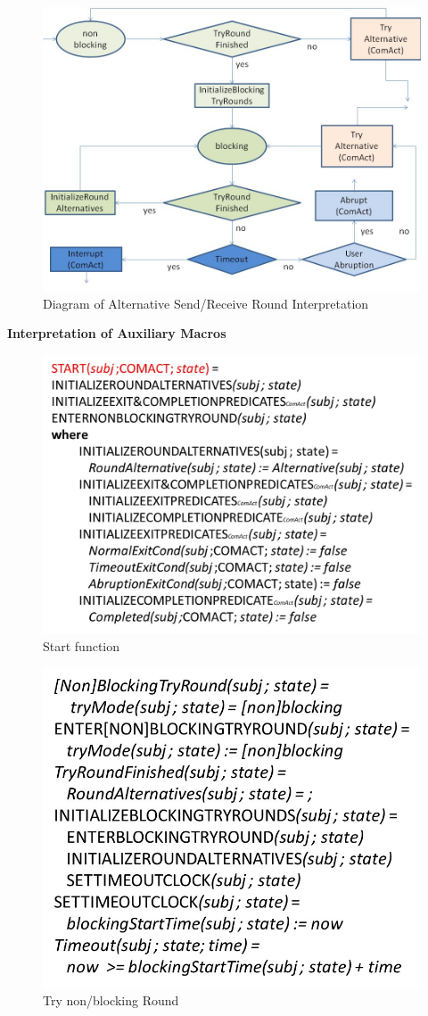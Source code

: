 \begin{figure}[ph]
	\centering
	\includegraphics[width=0.6\linewidth]{20181026-Ontologie-Bilder/Grafiken-Ontologie/SUbjectExecution/ASM-Perform-Bild}
	\caption[Diagram of Alternative Send/Receive Round Interpretation]{Diagram of Alternative Send/Receive Round Interpretation}
	\label{fig:asm-perform-bild}
\end{figure}

\newpage
\textbf{Interpretation of Auxiliary Macros}
\begin{figure}[ph]
	\centering
	\includegraphics[width=0.7\linewidth]{20181026-Ontologie-Bilder/Grafiken-Ontologie/SUbjectExecution/ASM-Start}
	\caption[Start function]{Start function}
	\label{fig:asm-start}
\end{figure}

\begin{figure}[ph]
	\centering
	\includegraphics[width=0.6\linewidth]{20181026-Ontologie-Bilder/Grafiken-Ontologie/SUbjectExecution/ASM-Try-Run}
	\caption[Try non/blocking Round]{Try non/blocking Round}
	\label{fig:asm-try-run}
\end{figure}

